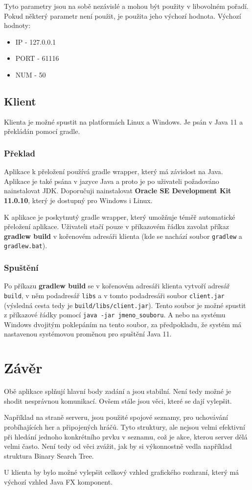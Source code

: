 \documentclass[12pt]{report}
\begin{document}
Tyto parametry jsou na sobě nezávislé a mohou být použity v libovolném pořadí. Pokud některý parametr
není použit, je použita jeho výchozí hodnota.
Výchozí hodnoty:
\begin{itemize}
	\item IP - 127.0.0.1
	\item PORT - 61116
	\item NUM - 50
\end{itemize}
%
\section{Klient}
Klienta je možné spustit na platformách Linux a Windows. Je psán v Java 11 a překládán pomocí gradle.
\subsection{Překlad}
Aplikace k přeložení používá gradle wrapper, který má závislost na Java. Aplikace je také psána v jazyce 
Java a proto je po uživateli požadováno nainstalovat JDK. Doporučuji nainstalovat 
\textbf{Oracle SE Development Kit 11.0.10}, který je dostupný pro Windows i Linux.

K aplikace je poskytnutý gradle wrapper, který umožňuje téměř automatické přeložení aplikace.
Uživateli stačí pouze v příkazovém řádku zavolat příkaz \textbf{gradlew build} v kořenovém adresáři
klienta (kde se nachází soubor \texttt{gradlew} a \texttt{gradlew.bat}).
%
\subsection{Spuštění}
Po příkazu \textbf{gradlew build} se v kořenovém adresáři klienta vytvoří adresář \texttt{build},
v něm podadresář \texttt{libs} a v tomto podadresáři soubor \texttt{client.jar} 
(výsledná cesta tedy je \texttt{build/libs/client.jar}). Tento soubor je možné spustit z příkazové řádky
pomocí \texttt{java -jar jmeno\_souboru}. A nebo na systému Windows dvojitým poklepáním na tento soubor, za
předpokladu, že systém má nastavenou systémovou proměnou pro spuštění Java 11.
%
\chapter{Závěr}
Obě aplikace splňují hlavní body zadání a jsou stabilní. Není tedy možné je shodit nesprávnou komunikací.
Ovšem stále jsou věci, které se dají vylepšit.

Například na straně serveru, jsou použité spojové seznamy, pro 
uchovávání probíhajících her a připojených hráčů. Tyto struktury, ale nejsou velmi efektivní při hledání jednoho
konkrétního prvku v seznamu, což je akce, kterou server dělá velmi často. Není tedy od věci zvážit, jak by si
výkonnostně vedla například struktura Binary Search Tree.

U klienta by bylo možné vylepšit celkový vzhled grafického rozhraní, který má výchozí vzhled Java FX komponent.
\end{document}
